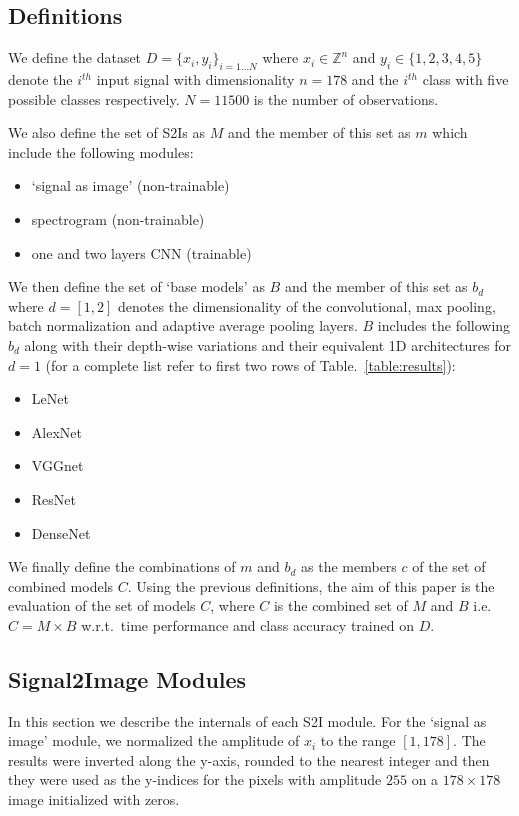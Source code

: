 \documentclass[conference]{IEEEtran}
\begin{document}
\subsection{Definitions}
We define the dataset $D=\{x_i, y_i\}_{i=1\ldots N}$ where $x_i \in \mathbb{Z}^n$ and $y_i \in \{1, 2, 3, 4, 5\}$ denote the $i^{th}$ input signal with dimensionality $n=178$ and the $i^{th}$ class with five possible classes respectively. %
$N=11500$ is the number of observations.

We also define the set of S2Is as $M$ and the member of this set as $m$ which include the following modules:
\begin{itemize}
  \item `signal as image' (non-trainable)
  \item spectrogram (non-trainable)
  \item one and two layers CNN (trainable)
\end{itemize}

We then define the set of `base models' as $B$ and the member of this set as $b_d$ where $d=[1,2]$ denotes the dimensionality of the convolutional, max pooling, batch normalization and adaptive average pooling layers.
$B$ includes the following $b_d$ along with their depth-wise variations and their equivalent 1D architectures for $d=1$ (for a complete list refer to first two rows of Table.~\ref{table:results}):
\begin{itemize}
  \item LeNet~\cite{lecun1998gradient}
  \item AlexNet~\cite{krizhevsky2012imagenet}
  \item VGGnet~\cite{simonyan2014very}
  \item ResNet~\cite{he2016deep}
  \item DenseNet~\cite{huang2017densely}
\end{itemize}

We finally define the combinations of $m$ and $b_d$ as the members $c$ of the set of combined models $C$.
Using the previous definitions, the aim of this paper is the evaluation of the set of models $C$, where $C$ is the combined set of $M$ and $B$ i.e. $C=M\times B$ w.r.t.\ time performance and class accuracy trained on $D$.

\subsection{Signal2Image Modules}
In this section we describe the internals of each S2I module.
For the `signal as image' module, we normalized the amplitude of $x_i$ to the range $[1, 178]$.
The results were inverted along the y-axis, rounded to the nearest integer and then they were used as the y-indices for the pixels with amplitude $255$ on a $178\times 178$ image initialized with zeros.
\end{document}
